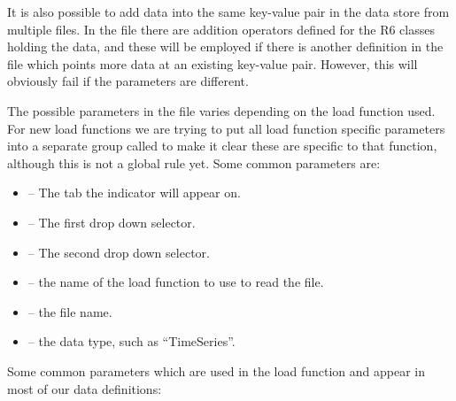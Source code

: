 \documentclass[12pt]{article}
\begin{document}
It is also possible to add data into the same key-value pair in the data store from multiple files.  In the  file there are addition operators defined for the R6 classes holding the data, and these will be employed if there is another definition in the  file which points more data at an existing key-value pair.  However, this will obviously fail if the  parameters are different.

The possible parameters in the  file varies depending on the load function used.  For new load functions we are trying to put all load function specific parameters into a separate group called  to make it clear these are specific to that function, although this is not a global rule yet.  Some common parameters are:
\begin{itemize}
\item {} -- The tab the indicator will appear on.
\item {} -- The first drop down selector.
\item {} -- The second drop down selector.
\item {} -- the name of the load function to use to read the file.
\item {} -- the file name.
\item {} -- the data type, such as ``TimeSeries''.
\end{itemize}
Some common parameters which are used in the  load function and appear in most of our data definitions:
\end{document}
